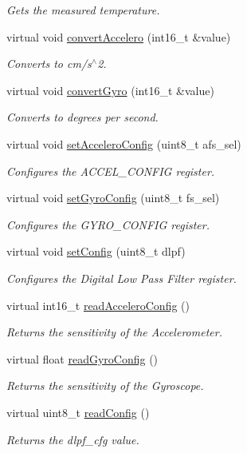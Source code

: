 \begin{DoxyCompactItemize}
\begin{DoxyCompactList}\small\item\em Gets the measured temperature. \end{DoxyCompactList}\item 
virtual void \hyperlink{classMpu6050_ac7d9ff1fd682cf54eac232532eabd5ba}{convert\+Accelero} (int16\+\_\+t \&value)
\begin{DoxyCompactList}\small\item\em Converts to cm/s$^\wedge$2. \end{DoxyCompactList}\item 
virtual void \hyperlink{classMpu6050_ab664732bd9c7d6ce8034eac6d93987fa}{convert\+Gyro} (int16\+\_\+t \&value)
\begin{DoxyCompactList}\small\item\em Converts to degrees per second. \end{DoxyCompactList}\item 
virtual void \hyperlink{classMpu6050_a3cfca1ea37e1d1bc4aebba7ceedb5a28}{set\+Accelero\+Config} (uint8\+\_\+t afs\+\_\+sel)
\begin{DoxyCompactList}\small\item\em Configures the A\+C\+C\+E\+L\+\_\+\+C\+O\+N\+F\+IG register. \end{DoxyCompactList}\item 
virtual void \hyperlink{classMpu6050_aef89bc30955f1db83eed1bb0dc9ec175}{set\+Gyro\+Config} (uint8\+\_\+t fs\+\_\+sel)
\begin{DoxyCompactList}\small\item\em Configures the G\+Y\+R\+O\+\_\+\+C\+O\+N\+F\+IG register. \end{DoxyCompactList}\item 
virtual void \hyperlink{classMpu6050_a39dc9a11251acf10c9c3b24e84ec8a57}{set\+Config} (uint8\+\_\+t dlpf)
\begin{DoxyCompactList}\small\item\em Configures the Digital Low Pass Filter register. \end{DoxyCompactList}\item 
virtual int16\+\_\+t \hyperlink{classMpu6050_a2f4ca51ed27c06d62b8060841c62ec4b}{read\+Accelero\+Config} ()
\begin{DoxyCompactList}\small\item\em Returns the sensitivity of the Accelerometer. \end{DoxyCompactList}\item 
virtual float \hyperlink{classMpu6050_a1a6e1a3452ee6d6d667c5ae425326772}{read\+Gyro\+Config} ()
\begin{DoxyCompactList}\small\item\em Returns the sensitivity of the Gyroscope. \end{DoxyCompactList}\item 
virtual uint8\+\_\+t \hyperlink{classMpu6050_acae18af6f85523362243bb61cf865586}{read\+Config} ()
\begin{DoxyCompactList}\small\item\em Returns the dlpf\+\_\+cfg value. \end{DoxyCompactList}\end{DoxyCompactItemize}
